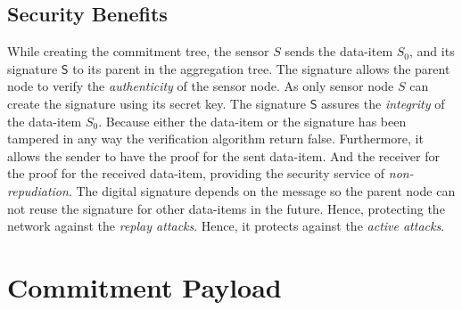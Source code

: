 	\subsection{Security Benefits}
		\label{subsec:security benefits of signing the data-item}
		While creating the commitment tree, the sensor $S$ sends the data-item $S_{0}$, and its signature $\textsf{S}$ to its parent in the aggregation tree.
		The signature allows the parent node to verify the \textit{authenticity} of the sensor node.
		As only sensor node $S$ can create the signature using its secret key. 
		The signature $\textsf{S}$ assures the \textit{integrity} of the data-item $S_{0}$.
		Because either the data-item or the signature has been tampered in any way the verification algorithm return false.
		Furthermore, it allows the sender to have the proof for the sent data-item.
		And the receiver for the proof for the received data-item, providing the security service of \textit{non-repudiation}.
		The digital signature depends on the message so the parent node can not reuse the signature for other data-items in the future.
		Hence, protecting the network against the \textit{replay attacks}.
		Hence, it protects against the \textit{active attacks}.

\section{Commitment Payload}

